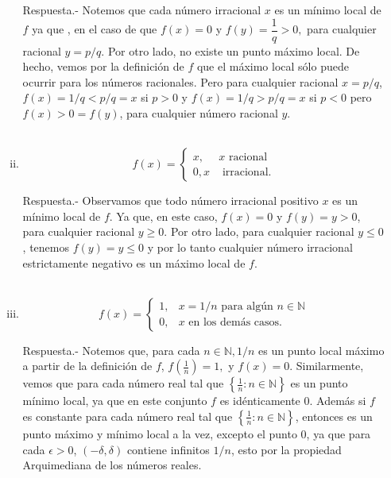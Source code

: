 \begin{enumerate}[\bfseries 1.]
\begin{enumerate}[(i)]
		Respuesta.-\; Notemos que cada número irracional $x$ es un mínimo local de $f$ ya que , en el caso de que $f(x)=0$ y $f(y)=\dfrac{1}{q}>0,$ para cualquier racional $y=p/q$. Por otro lado, no existe un punto máximo local. De hecho, vemos por la definición de $f$ que el máximo local sólo puede ocurrir para los números racionales. Pero para cualquier racional $x=p/q$, $f(x)=1/q<p/q=x$ si $p>0$ y $f(x)=1/q>p/q=x$  si $p<0$ pero $f(x)>0=f(y)$, para cualquier número racional $y$.\\\\

	    \item \;
	    $$f(x)=\left\{\begin{array}{rl}
		    x,& x \mbox{ racional}\\
		    0, x& \mbox{ irracional}.
	    \end{array}\right.$$
	    \vspace{0.4cm}

		Respuesta.-\; Observamos que todo número irracional positivo $x$ es un mínimo local de $f$. Ya que, en este caso, $f(x)=0$ y $f(y)=y>0$, para cualquier racional $y\geq0$. Por otro lado, para cualquier racional $y\leq 0$, tenemos $f(y)=y\leq 0$ y por lo tanto cualquier número irracional estrictamente negativo es un máximo local de $f$.\\\\

	    \item \;
	    $$f(x)=\left\{\begin{array}{rl}
		    1, & x=1/n \mbox{ para algún } n\in \mathbb{N}\\
		    0, &x \mbox{ en los demás casos}.
	    \end{array}\right.$$
	    \vspace{0.4cm}

	    Respuesta.-\; Notemos que, para cada $n\in \mathbb{N}, 1/n$ es un punto local máximo a partir de la definición de $f$, $f(\frac{1}{n})=1,$ y $f(x)=0.$ Similarmente, vemos que para cada número real tal que $\left\{\frac{1}{n}:n\in \mathbb{N}\right\}$ es un punto mínimo local, ya que en este conjunto $f$ es idénticamente $0$. Además si $f$ es constante para cada número real tal que $\left\{\frac{1}{n}:n\in \mathbb{N}\right\}$, entonces es un punto máximo y mínimo local a la vez, excepto el punto $0$, ya que para cada $\epsilon>0$, $(-\delta, \delta)$ contiene infinitos $1/n$, esto por la propiedad Arquimediana de los números reales.\\\\


\end{enumerate}
\end{enumerate}
